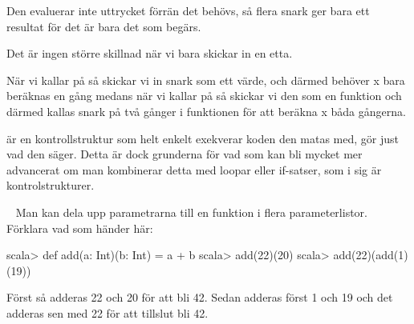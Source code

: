 \SOLUTION


\TaskSolved \what


\SubtaskSolved  {}

\SubtaskSolved  {}

Den evaluerar inte uttrycket förrän det behövs, så flera snark ger bara ett resultat för det är bara det som begärs.

\SubtaskSolved  {}

\SubtaskSolved  {}

Det är ingen större skillnad när vi bara skickar in en etta.

\SubtaskSolved  {}

\SubtaskSolved  När vi kallar på  så skickar vi in snark som ett värde, och därmed behöver x bara beräknas en gång medans när vi kallar på  så skickar vi den som en funktion och därmed kallas snark på två gånger i funktionen för att beräkna x båda gångerna.


\SubtaskSolved  {} är en kontrollstruktur som helt enkelt exekverar koden den matas med,  gör just vad den säger. Detta är dock grunderna för vad som kan bli mycket mer advancerat om man kombinerar detta med loopar eller if-satser, som i sig är kontrolstrukturer.



\QUESTEND









\QUESTBEGIN

\Task  \what~  Man kan dela upp parametrarna till en funktion i flera parameterlistor. Förklara vad som händer här:
\begin{REPL}
scala> def add(a: Int)(b: Int) = a + b
scala> add(22)(20)
scala> add(22)(add(1)(19))
\end{REPL}


\SOLUTION


\TaskSolved \what


Först så adderas 22 och 20 för att bli 42.
Sedan adderas först 1 och 19 och det adderas sen med 22 för att tillslut bli 42.



\QUESTEND




